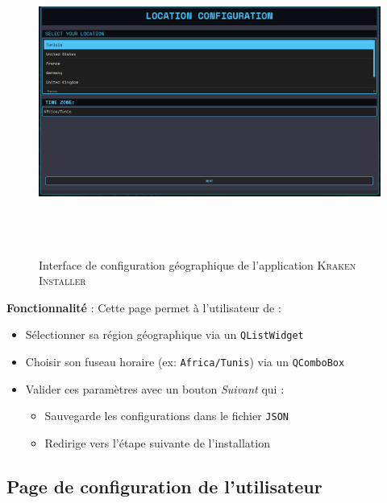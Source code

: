 \begin{figure}[H]
  \centering
  \includegraphics[width=1\textwidth, height=10cm]{images_pfe/location.png}
  \caption{Interface de configuration géographique de l'application \textsc{Kraken Installer}}
  \label{fig:locationpage}
\end{figure}

\textbf{Fonctionnalité} : Cette page permet à l'utilisateur de :
\begin{itemize}
    \item Sélectionner sa région géographique via un \texttt{QListWidget}
    \item Choisir son fuseau horaire (ex: \texttt{Africa/Tunis}) via un \texttt{QComboBox}
    \item Valider ces paramètres avec un bouton \textit{Suivant} qui :
    \begin{itemize}
        \item Sauvegarde les configurations dans le fichier \texttt{JSON}
        \item Redirige vers l'étape suivante de l'installation
    \end{itemize}
\end{itemize}



\subsection{Page de configuration de l'utilisateur}

